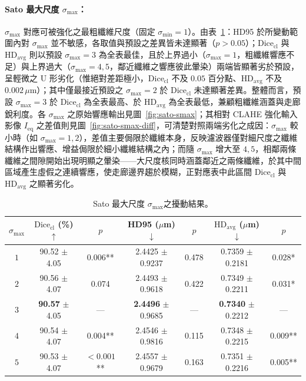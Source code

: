 \paragraph{Sato 最大尺度 $\sigma_{\max}$：} $\sigma_{\max}$ 對應可被強化之最粗纖維尺度（固定 $\sigma_{\min} = 1$）。由表~\ref{tab:param-sstop}：HD95 於所變動範圍內對 $\sigma_{\max}$ 並不敏感，各取值與預設之差異皆未達顯著（$p > 0.05$）；$\text{Dice}_{\text{cl}}$ 與 $\text{HD}_{\text{avg}}$ 則以預設 $\sigma_{\max} = 3$ 為全表最佳，且於上界過小（$\sigma_{\max} = 1$，粗纖維響應不足）與上界過大（$\sigma_{\max} = 4, 5$，鄰近纖維之響應彼此暈染）兩端皆顯著劣於預設，呈輕微之 U 形劣化（惟絕對差距極小，$\text{Dice}_{\text{cl}}$ 不及 $0.05$ 百分點、$\text{HD}_{\text{avg}}$ 不及 $0.002\,\mu\text{m}$）；其中僅最接近預設之 $\sigma_{\max} = 2$ 於 $\text{Dice}_{\text{cl}}$ 未達顯著差異。整體而言，預設 $\sigma_{\max} = 3$ 於 $\text{Dice}_{\text{cl}}$ 為全表最高、於 $\text{HD}_{\text{avg}}$ 為全表最低，兼顧粗纖維涵蓋與走廊銳利度。各 $\sigma_{\max}$ 之原始響應輸出見圖~\ref{fig:sato-smax}；其相對 CLAHE 強化輸入影像 $I_{\text{eq}}$ 之差值則見圖~\ref{fig:sato-smax-diff}，可清楚對照兩端劣化之成因：$\sigma_{\max}$ 較小時（如 $\sigma_{\max} = 1, 2$），差值主要侷限於纖維本身，反映濾波器僅對細尺度之纖維結構作出響應、增益侷限於細小纖維結構之內；而隨 $\sigma_{\max}$ 增大至 $4, 5$，相鄰兩條纖維之間隙開始出現明顯之暈染——大尺度核同時涵蓋鄰近之兩條纖維，於其中間區域產生虛假之連續響應，使走廊邊界趨於模糊，正對應表中此區間 $\text{Dice}_{\text{cl}}$ 與 $\text{HD}_{\text{avg}}$ 之顯著劣化。

\begin{table}[htbp]
  \centering
  \caption{Sato 最大尺度 $\sigma_{\max}$之擾動結果。}
  \label{tab:param-sstop}
  \small
  \setlength{\tabcolsep}{4pt}
  \begin{tabular}{ccccccc}
    \toprule
    $\sigma_{\max}$ & $\text{Dice}_{\text{cl}}$ (\%) $\uparrow$ & $p$ & HD95 ($\mu$m) $\downarrow$ & $p$ & $\text{HD}_{\text{avg}}$ ($\mu$m) $\downarrow$ & $p$ \\
    \midrule
    $1$ & 90.52 $\pm$ 4.05 & 0.006** & 2.4425 $\pm$ 0.9237 & 0.478 & 0.7359 $\pm$ 0.2181 & 0.028* \\
    $2$ & 90.56 $\pm$ 4.07 & 0.074   & 2.4493 $\pm$ 0.9618 & 0.422 & 0.7349 $\pm$ 0.2211 & 0.031* \\
    \textbf{$3$} & \textbf{90.57} $\pm$ 4.05 & --- & \textbf{2.4496} $\pm$ 0.9685 & --- & \textbf{0.7340} $\pm$ 0.2212 & --- \\
    $4$ & 90.54 $\pm$ 4.07 & 0.004** & 2.4546 $\pm$ 0.9816 & 0.115 & 0.7348 $\pm$ 0.2215 & 0.009** \\
    $5$ & 90.53 $\pm$ 4.07 & $<\!0.001$** & 2.4557 $\pm$ 0.9679 & 0.163 & 0.7351 $\pm$ 0.2216 & 0.005** \\
    \bottomrule
  \end{tabular}
\end{table}

